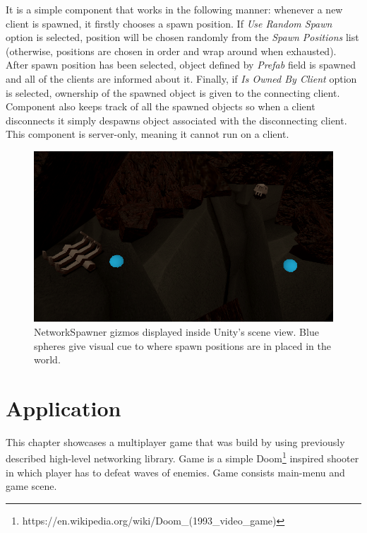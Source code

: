 \documentclass[times, utf8, diplomski]{fer}
\begin{document}
It is a simple component that works in the following manner: whenever a new client is spawned, it firstly chooses a spawn position. If \textit{Use Random Spawn} option is selected, position will be chosen randomly from the \textit{Spawn Positions} list (otherwise, positions are chosen in order and wrap around when exhausted). \\

After spawn position has been selected, object defined by \textit{Prefab} field is spawned and all of the clients are informed about it. Finally, if \textit{Is Owned By Client} option is selected, ownership of the spawned object is given to the connecting client. \\

Component also keeps track of all the spawned objects so when a client disconnects it simply despawns object associated with the disconnecting client. This component is server-only, meaning it cannot run on a client.

\begin{figure}[H]
	\centering
	\includegraphics[scale=0.65]{NetworkSpawner-example}
	\caption{NetworkSpawner gizmos displayed inside Unity's scene view. Blue spheres give visual cue to where spawn positions are in placed in the world.}
\end{figure}

\chapter{Application}
This chapter showcases a multiplayer game that was build by using previously described high-level networking library. Game is a simple Doom\footnote{https://en.wikipedia.org/wiki/Doom\_(1993\_video\_game)} inspired shooter in which player has to defeat waves of enemies. Game consists main-menu and game scene.
\end{document}
